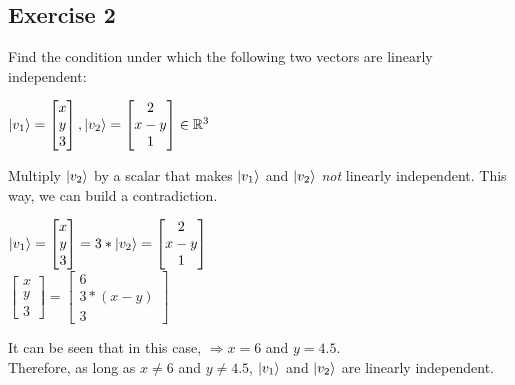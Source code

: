 \documentclass[12pt]{article}
\theoremstyle{plain}
\theoremstyle{nonumberplain}
\theoremstyle{plain}
\theoremstyle{nonumberplain}
\newcommand\1{{\bf 1}}
\newcommand{\bmat}[1]{\begin{bmatrix*} #1 \end{bmatrix*}} %
\newcommand{\R}{\mathbb{R}} %
\newcommand{\<}{\left\langle}
\renewcommand{\>}{\right\rangle}
\begin{document}

\subsection{Exercise 2}
Find the condition under which the following two vectors are linearly independent:
\begin{center}
$\ket{v_1}=\bmat{x \\ y \\ 3},\ket{v_2}=\bmat{2 \\ x-y \\ 1}\in\R^3$
\end{center}
Multiply $\ket{v_2}$ by a scalar that makes $\ket{v_1}$ and $\ket{v_2}$ \textit{not} linearly independent. This way, we can build a contradiction.
\begin{center}
$\ket{v_1}=\bmat{x \\ y \\ 3} = 3*\ket{v_2}=\bmat{2 \\ x-y \\ 1}$ \\
$\bmat{x \\ y \\ 3}=\bmat{6 \\ 3*(x-y) \\ 3}$
\end{center}
It can be seen that in this case, $\Longrightarrow x=6$ and $y=4.5$. \\
Therefore, as long as $x\neq6$ and $y\neq4.5$, $\ket{v_1}$ and $\ket{v_2}$ are linearly independent.

\end{document}
